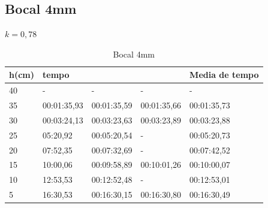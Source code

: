 \documentclass[12pt]{article}
\begin{document}
\subsection[short]{Bocal 4mm}
$ k = 0,78 $
\begin{table}[H]
    \begin{tabular}{|l|lll|l|}
        \hline
        h(cm) & tempo                            &                                  &             & Media de tempo \\ \hline
        40    & \multicolumn{1}{l|}{-}           & \multicolumn{1}{l|}{-}           & -           & -              \\ \hline
        35    & \multicolumn{1}{l|}{00:01:35,93} & \multicolumn{1}{l|}{00:01:35,59} & 00:01:35,66 & 00:01:35,73    \\ \hline
        30    & \multicolumn{1}{l|}{00:03:24,13} & \multicolumn{1}{l|}{00:03:23,63} & 00:03:23,89 & 00:03:23,88    \\ \hline
        25    & \multicolumn{1}{l|}{05:20,92}    & \multicolumn{1}{l|}{00:05:20,54} & -           & 00:05:20,73    \\ \hline
        20    & \multicolumn{1}{l|}{07:52,35}    & \multicolumn{1}{l|}{00:07:32,69} & -           & 00:07:42,52    \\ \hline
        15    & \multicolumn{1}{l|}{10:00,06}    & \multicolumn{1}{l|}{00:09:58,89} & 00:10:01,26 & 00:10:00,07    \\ \hline
        10    & \multicolumn{1}{l|}{12:53,53}    & \multicolumn{1}{l|}{00:12:52,48} & -           & 00:12:53,01    \\ \hline
        5     & \multicolumn{1}{l|}{16:30,53}    & \multicolumn{1}{l|}{00:16:30,15} & 00:16:30,80 & 00:16:30,49    \\ \hline
    \end{tabular}
    \caption{Bocal 4mm}
\end{table}
\end{document}
